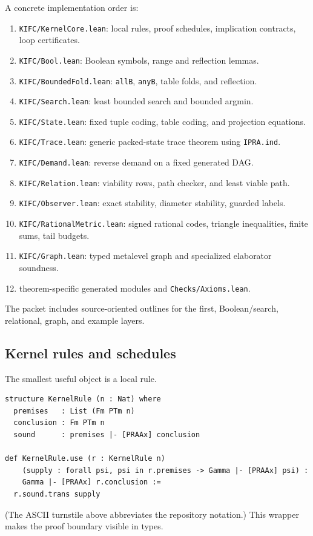A concrete implementation order is:
\begin{enumerate}[label=\textbf{M\arabic*.}]
  \item \texttt{KIFC/KernelCore.lean}: local rules, proof schedules, implication contracts, loop certificates.
  \item \texttt{KIFC/Bool.lean}: Boolean symbols, range and reflection lemmas.
  \item \texttt{KIFC/BoundedFold.lean}: \texttt{allB}, \texttt{anyB}, table folds, and reflection.
  \item \texttt{KIFC/Search.lean}: least bounded search and bounded argmin.
  \item \texttt{KIFC/State.lean}: fixed tuple coding, table coding, and projection equations.
  \item \texttt{KIFC/Trace.lean}: generic packed-state trace theorem using \texttt{IPRA.ind}.
  \item \texttt{KIFC/Demand.lean}: reverse demand on a fixed generated DAG.
  \item \texttt{KIFC/Relation.lean}: viability rows, path checker, and least viable path.
  \item \texttt{KIFC/Observer.lean}: exact stability, diameter stability, guarded labels.
  \item \texttt{KIFC/RationalMetric.lean}: signed rational codes, triangle inequalities, finite sums, tail budgets.
  \item \texttt{KIFC/Graph.lean}: typed metalevel graph and specialized elaborator soundness.
  \item theorem-specific generated modules and \texttt{Checks/Axioms.lean}.
\end{enumerate}
The packet includes source-oriented outlines for the first, Boolean/search, relational, graph, and example layers.

\subsection{Kernel rules and schedules}

The smallest useful object is a local rule.

\begin{lstlisting}
structure KernelRule (n : Nat) where
  premises   : List (Fm PTm n)
  conclusion : Fm PTm n
  sound      : premises |- [PRAAx] conclusion

def KernelRule.use (r : KernelRule n)
    (supply : forall psi, psi in r.premises -> Gamma |- [PRAAx] psi) :
    Gamma |- [PRAAx] r.conclusion :=
  r.sound.trans supply
\end{lstlisting}
(The ASCII turnstile above abbreviates the repository notation.)  This wrapper makes the proof boundary visible in types.

